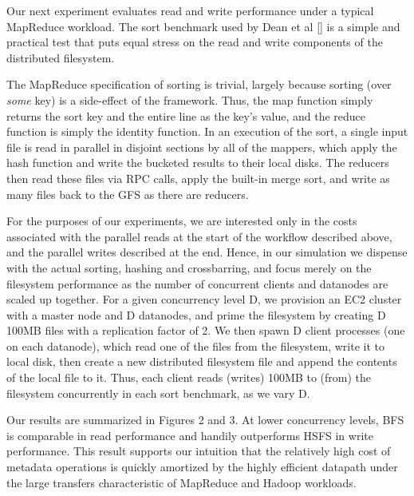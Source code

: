 \documentclass{article}
\begin{document}
Our next experiment evaluates read and write performance under a typical MapReduce workload.  The sort benchmark used by Dean et al [] is a simple and practical test that puts equal stress on the read and write components of the distributed filesystem.  

The MapReduce specification of sorting is trivial, largely because sorting (over \emph{some} key) is a side-effect of the framework.  Thus, the map function simply returns the sort key and the entire line as the key's value, and the reduce function is simply the identity function.  In an execution of the sort, a single input file is read in parallel in disjoint sections by all of the mappers, which apply the hash function and write the bucketed results to their local disks.  The reducers then read these files via RPC calls, apply the built-in merge sort, and write as many files back to the GFS as there are reducers.

For the purposes of our experiments, we are interested only in the costs associated with the parallel reads at the start of the workflow described above, and the parallel writes described at the end.  Hence, in our simulation we dispense with the actual sorting, hashing and crossbarring, and focus merely on the filesystem performance as  the number of concurrent clients and datanodes are scaled up together.  For a given concurrency level D, we provision an EC2 cluster with a master node and D datanodes, and prime the filesystem by creating D 100MB files with a replication factor of 2.  We then spawn D client processes (one on each datanode), which read one of the files from the filesystem, write it to local disk, then create a new distributed filesystem file and append the contents of the local file to it.  Thus, each client reads (writes) 100MB to (from) the filesystem concurrently in each sort benchmark, as we vary D.

Our results are summarized in Figures 2 and 3.  At lower concurrency levels, BFS is comparable in read performance and handily outperforms HSFS in write performance.  This result supports our intuition that the relatively high cost of metadata operations is quickly amortized by the highly efficient datapath under the large transfers characteristic of MapReduce and Hadoop workloads.
\end{document}
